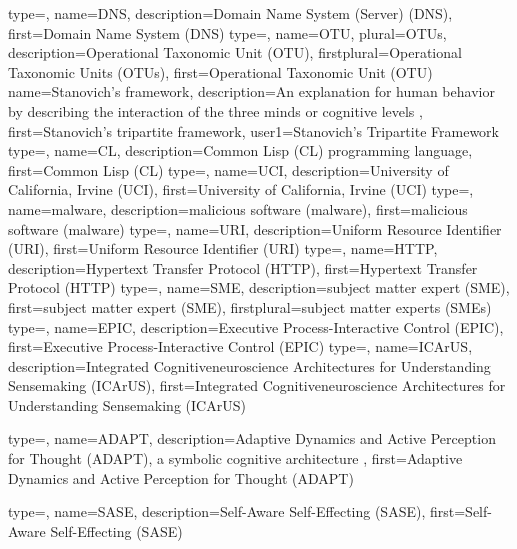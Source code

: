 {
  type=\acronymtype,
  name=DNS,
  description={Domain Name System (Server) (DNS)},
  first={Domain Name System (DNS)}
}
{
  type=\acronymtype,
  name=OTU,
  plural={OTUs},
  description={Operational Taxonomic Unit (OTU)},
  firstplural={Operational Taxonomic Units (OTUs)},
  first={Operational Taxonomic Unit (OTU)}
}
{
  name=Stanovich's framework,
  description={An explanation for human behavior by describing the interaction of the three minds or cognitive levels \citep{Stanovich2009IntTest}},
  first={Stanovich's tripartite framework},
  user1={Stanovich's Tripartite Framework}
}
{
  type=\acronymtype,
  name=CL,
  description={Common Lisp (CL) programming language},
  first={Common Lisp (CL)}
}
{
  type=\acronymtype,
  name=UCI,
  description={University of California, Irvine (UCI)},
  first={University of California, Irvine (UCI)}
}
{
  type=\acronymtype,
  name=malware,
  description={malicious software (malware)},
  first={malicious software (malware)}
}
{
  type=\acronymtype,
  name=URI,
  description={Uniform Resource Identifier (URI)},
  first={Uniform Resource Identifier (URI)}
}
{
  type=\acronymtype,
  name=HTTP,
  description={Hypertext Transfer Protocol (HTTP)},
  first={Hypertext Transfer Protocol (HTTP)}
}
{
  type=\acronymtype,
  name=SME,
  description={subject matter expert (SME)},
  first={subject matter expert (SME)},
  firstplural={subject matter experts (SMEs)}
}
{
  type=\acronymtype,
  name=EPIC,
  description={Executive Process-Interactive Control (EPIC)},
  first={Executive Process-Interactive Control (EPIC)}
}
{
  type=\acronymtype,
  name=ICArUS,
  description={Integrated Cognitive\textendash{}neu\-ro\-science Architectures for Understanding Sensemaking (ICArUS)},
  first={Integrated Cognitive\textendash{}neu\-ro\-science Architectures for Understanding Sensemaking (ICArUS)}
}

{
  type=\acronymtype,
  name=ADAPT,
  description={Adaptive Dynamics and Active Perception for Thought (ADAPT), a symbolic cognitive architecture \citep{benjamin2004adapt}},
  first={Adaptive Dynamics and Active Perception for Thought (ADAPT)}
}

{
  type=\acronymtype,
  name=SASE,
  description={Self-Aware Self-Effecting (SASE)},
  first={Self-Aware Self-Effecting (SASE)}
}

